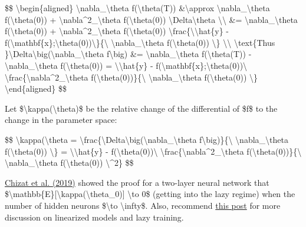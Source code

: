 \$\$ \textbackslash begin\{aligned\} \textbackslash nabla\_\textbackslash theta f(\textbackslash theta(T)) \&\textbackslash approx \textbackslash nabla\_\textbackslash theta f(\textbackslash theta(0)) + \textbackslash nabla\^{}2\_\textbackslash theta f(\textbackslash theta(0)) \textbackslash Delta\textbackslash theta \textbackslash\textbackslash{} \&= \textbackslash nabla\_\textbackslash theta f(\textbackslash theta(0)) + \textbackslash nabla\^{}2\_\textbackslash theta f(\textbackslash theta(0)) \textbackslash frac\{\textbackslash\textbar\textbackslash hat\{y\} - f(\textbackslash mathbf\{x\};\textbackslash theta(0))\textbackslash\textbar\}\{\textbackslash\textbar{} \textbackslash nabla\_\textbackslash theta f(\textbackslash theta(0)) \textbackslash\textbar\} \textbackslash\textbackslash{} \textbackslash text\{Thus \}\textbackslash Delta\textbackslash big(\textbackslash nabla\_\textbackslash theta f\textbackslash big) \&= \textbackslash nabla\_\textbackslash theta f(\textbackslash theta(T)) - \textbackslash nabla\_\textbackslash theta f(\textbackslash theta(0)) = \textbackslash\textbar\textbackslash hat\{y\} - f(\textbackslash mathbf\{x\};\textbackslash theta(0))\textbackslash\textbar{} \textbackslash frac\{\textbackslash nabla\^{}2\_\textbackslash theta f(\textbackslash theta(0))\}\{\textbackslash\textbar{} \textbackslash nabla\_\textbackslash theta f(\textbackslash theta(0)) \textbackslash\textbar\} \textbackslash end\{aligned\} \$\$

Let \$\textbackslash kappa(\textbackslash theta)\$ be the relative change of the differential of \$f\$ to the change in the parameter space:

\$\$ \textbackslash kappa(\textbackslash theta = \textbackslash frac\{\textbackslash Delta\textbackslash big(\textbackslash nabla\_\textbackslash theta f\textbackslash big)\}\{\textbackslash\textbar{} \textbackslash nabla\_\textbackslash theta f(\textbackslash theta(0)) \textbackslash\textbar\} = \textbackslash\textbar\textbackslash hat\{y\} - f(\textbackslash theta(0))\textbackslash\textbar{} \textbackslash frac\{\textbackslash nabla\^{}2\_\textbackslash theta f(\textbackslash theta(0))\}\{\textbackslash\textbar{} \textbackslash nabla\_\textbackslash theta f(\textbackslash theta(0)) \textbackslash\textbar\^{}2\} \$\$

\href{https://arxiv.org/abs/1812.07956}{Chizat et al. (2019)} showed the proof for a two-layer neural network that \$\textbackslash mathbb\{E\}{[}\textbackslash kappa(\textbackslash theta\_0){]} \textbackslash to 0\$ (getting into the lazy regime) when the number of hidden neurons \$\textbackslash to \textbackslash infty\$. Also, recommend \href{https://rajatvd.github.io/NTK/}{this post} for more discussion on linearized models and lazy training.

